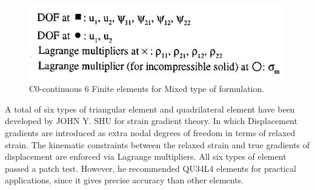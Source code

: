 \documentclass[12pt]{article}
\begin{document}
\begin{figure}[H]
	\begin{center}
		\includegraphics[scale=0.8]{Shu_info.JPG}
	\end{center}  
    \caption{C0-continuous 6 Finite elements for Mixed type of formulation.}
\end{figure}
A total of six types of triangular element and quadrilateral element have been developed by JOHN Y. SHU for strain gradient theory. In which Displacement gradients are introduced as extra nodal degrees of freedom in terms of relaxed strain. The kinematic constraints between the relaxed strain and true gradients of displacement are enforced via Lagrange multipliers. All six types of element passed a patch test. However, he recommended QU34L4 elements for practical applications, since it gives precise accuracy than other elements.
\end{document}
